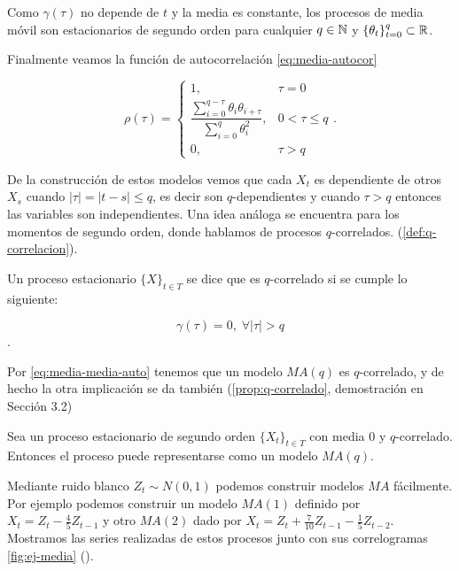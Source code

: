 Como $\gamma(\tau)$ no depende de $t$ y la media es constante, los procesos de media móvil son estacionarios de segundo orden para cualquier $q \in \mathbb{N}$ y $\{\theta_t\}_{t = 0}^q \subset \mathbb{R}$.

Finalmente veamos la función de autocorrelación \eqref{eq:media-autocor}

\begin{equation}
  \rho(\tau) = \begin{cases}
    1, & \tau = 0 \\
    \dfrac{\sum \limits^{q - \tau}_{i = 0} \theta_i \theta_{i + \tau}}{\sum \limits^q_{i = 0} \theta_i^2}, & 0 < \tau \leq q \\
    0, & \tau > q
  \end{cases}.
  \label{eq:media-autocor}
\end{equation}

De la construcción de estos modelos vemos que cada $X_t$ es dependiente de otros $X_s$ cuando $|\tau| = |t-s| \leq q$, es decir son $q$-dependientes y cuando $\tau > q$ entonces las variables son independientes. Una idea análoga se encuentra para los momentos de segundo orden, donde hablamos de procesos $q$-correlados. (\autoref{def:q-correlacion}).

\begin{definicion}
  Un proceso estacionario $\{X\}_{t \in T}$ se dice que es $q$-correlado si se cumple lo siguiente:

  $$\gamma(\tau) = 0, \; \forall |\tau| > q$$.
  \label{def:q-correlacion}
\end{definicion}

Por \eqref{eq:media-media-auto} tenemos que un modelo $MA(q)$ es $q$-correlado, y de hecho la otra implicación se da también (\autoref{prop:q-correlado}, demostración en \cite{brockwell1991time} Sección 3.2)

\begin{proposicion}
  Sea un proceso estacionario de segundo orden $\{X_t\}_{t \in T}$ con media 0 y $q$-correlado. Entonces el proceso puede representarse como un modelo $MA(q)$.
\label{prop:q-correlado}
\end{proposicion}

Mediante ruido blanco $Z_t \sim N(0, 1)$ podemos construir modelos $MA$ fácilmente. Por ejemplo podemos construir un modelo $MA(1)$ definido por $X_t = Z_t - \frac{4}{5}Z_{t - 1}$ y otro $MA(2)$ dado por $X_t = Z_t + \frac{7}{10} Z_{t - 1} - \frac{1}{5}Z_{t - 2}$. Mostramos las series realizadas de estos procesos junto con sus correlogramas \autoref{fig:ej-media} (\cite{chatfield2019analysis}).

